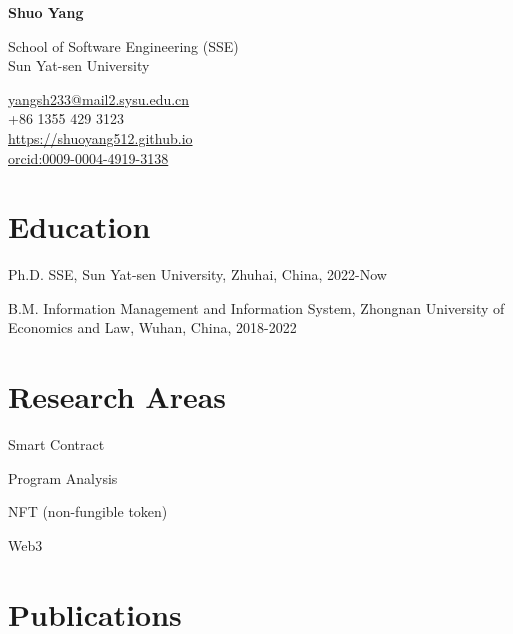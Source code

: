\documentclass[12pt,letterpaper]{report}
\newcommand{\myname}{Shuo Yang}
\newcommand{\namefont}[1]{{\normalfont\bfseries\Huge{#1}}}
\newcommand{\listitemspace}{0.25em}
\renewenvironment{itemize}
{\begin{list}{}{\setlength{\leftmargin}{0em}
                \setlength{\parskip}{0em}
                \setlength{\itemsep}{\listitemspace}
                \setlength{\parsep}{\listitemspace}}}
{\end{list}}
\begin{document}
    \raggedright{}

    \namefont{\myname}

    \vspace{1em}
    \begin{minipage}[t]{0.700\textwidth}
        School of Software Engineering (SSE)\\
        Sun Yat-sen University
    \end{minipage}
    \begin{minipage}[t]{0.295\textwidth}
        \flushright{}
        \href{yangsh233@mail2.sysu.edu.cn}{yangsh233@mail2.sysu.edu.cn} \\
        +86 1355 429 3123 \\
        \href{https://shuoyang512.github.io}{https://shuoyang512.github.io}\\
        \href{https://orcid.org/0009-0004-4919-3138}{orcid:0009-0004-4919-3138}
    \end{minipage}

    \section*{Education}
    
    \begin{tablist}
      \item[Ph.D.] \tab{}SSE, Sun Yat-sen University, Zhuhai, China, 2022-Now
      \item[B.M.] \tab{}Information Management and Information System, Zhongnan University of Economics and Law, Wuhan, China, 2018-2022
    \end{tablist}
    
    \section*{Research Areas}
    \begin{itemize}
      \item Smart Contract
      \item Program Analysis
      \item NFT (non-fungible token)
      \item Web3
    \end{itemize}
    
    \section*{Publications}
\end{document}
